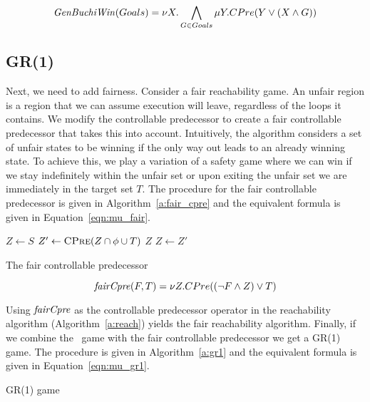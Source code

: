 \begin{equation}
    \mathit{GenBuchiWin}(Goals) = \nu X. \bigwedge_{G \in Goals} \mu Y. CPre(Y \vee (X \wedge G))
\label{eqn:mu_genbuchi}
\end{equation}

\subsection{GR(1)}

Next, we need to add fairness. Consider a fair reachability game. An unfair region is a region that we can assume execution will leave, regardless of the loops it contains. We modify the controllable predecessor to create a fair controllable predecessor that takes this into account. Intuitively, the algorithm considers a set of unfair states to be winning if the only way out leads to an already winning state. To achieve this, we play a variation of a safety game where we can win if we stay indefinitely within the unfair set or upon exiting the unfair set we are immediately in the target set $T$. The procedure for the fair controllable predecessor is given in Algorithm~\ref{a:fair_cpre} and the equivalent \mucalc formula is given in Equation~\ref{eqn:mu_fair}. 

\begin{algorithm}[t]
\begin{algorithmic}
\State $Z \gets S$
\Loop
\State $Z' \gets \Call{CPre}{Z \cap \phi \cup T}$
\State\Return $Z$\EndIf
\State $Z \gets Z'$
\EndLoop
\EndFunction
\end{algorithmic}
\caption{The fair controllable predecessor}
\label{a:fair_cpre}
\end{algorithm}

\begin{equation}
    \mathit{fairCpre}(F, T) = \nu Z. CPre((\neg F \wedge Z) \vee T)
\label{eqn:mu_fair}
\end{equation}

Using $\mathit{fairCpre}$ as the controllable predecessor operator in the reachability algorithm (Algorithm~\ref{a:reach}) yields the fair reachability algorithm. Finally, if we combine the \buchi\ game with the fair controllable predecessor we get a GR(1) game. The procedure is given in Algorithm~\ref{a:gr1} and the equivalent \mucalc formula is given in Equation~\ref{eqn:mu_gr1}.

\begin{algorithm}[t]
\begin{algorithmic}
\State\Return {}
\EndFunction
\end{algorithmic}
\caption{GR(1) game}
\label{a:gr1}
\end{algorithm}

